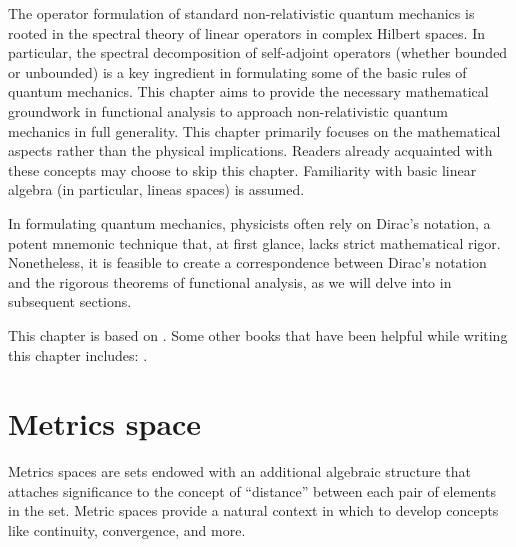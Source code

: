 




\begin{refsection}


The operator formulation of standard non-relativistic quantum mechanics is rooted in the spectral theory of linear operators in complex Hilbert spaces.
In particular, the spectral decomposition of self-adjoint operators (whether bounded or unbounded) is a key
ingredient in formulating some of the basic rules of quantum mechanics.
This chapter aims to provide the necessary mathematical groundwork in functional analysis to approach non-relativistic quantum mechanics in full generality. 
This chapter primarily focuses on the mathematical aspects rather than the physical implications.
Readers already acquainted with these concepts may choose to skip this chapter.
  Familiarity with basic linear algebra (in particular, lineas spaces) is assumed. 

In formulating quantum mechanics, physicists often rely on Dirac's notation, a potent mnemonic technique that, at first glance, lacks strict mathematical rigor. Nonetheless, it is feasible to create a correspondence between Dirac's notation and the rigorous theorems of functional analysis, as we will delve into in subsequent sections.

This chapter is based on \textcite{Reed.Simon:1980}. 
Some other books that have been helpful while writing this chapter includes:
\textcite{Teschl:2009,Berberian:1976,Hutson.Pym:1980,Debnath.Mikusinski:2005,Helmberg:1969}.


  \section{Metrics space}

Metrics spaces are sets endowed with an additional algebraic structure that attaches significance to the concept of ``distance'' between each pair of elements in the set.
Metric spaces provide a natural context in which to develop concepts like continuity, convergence, and more.


\end{refsection}
